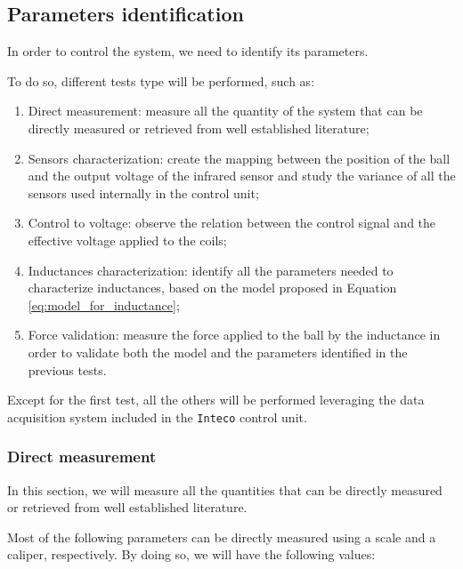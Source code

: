 \subsection{Parameters identification}
\label{subsec:parameters_identification}

In order to control the system, we need to identify its parameters.

To do so, different tests type will be performed, such as:

\begin{enumerate}
    \item Direct measurement: measure all the quantity of the system that can be directly measured or retrieved from well established literature;
    \item Sensors characterization: create the mapping between the position of the ball and the output voltage of the infrared sensor and study the variance of all the sensors used internally in the control unit;
    \item Control to voltage: observe the relation between the control signal and the effective voltage applied to the coils;
    \item Inductances characterization: identify all the parameters needed to characterize inductances, based on the model proposed in Equation \ref{eq:model_for_inductance};
    \item Force validation: measure the force applied to the ball by the inductance in order to validate both the model and the parameters identified in the previous tests.
\end{enumerate}

Except for the first test, all the others will be performed leveraging the data acquisition system included in the \texttt{Inteco} control unit.

\subsubsection{Direct measurement}
\label{subsubsec:direct_measurement}

In this section, we will measure all the quantities that can be directly measured or retrieved from well established literature.

Most of the following parameters can be directly measured using a scale and a caliper, respectively.
By doing so, we will have the following values:

